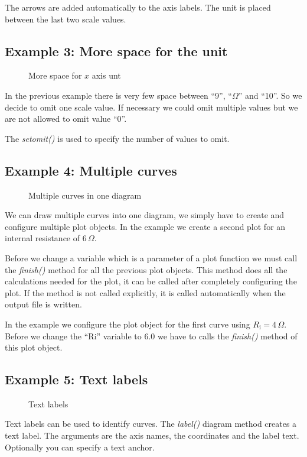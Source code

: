 \documentclass[origlongtable]{scrartcl}
\newcommand{\includepgfimage}[2]{%
\begin{figure}%
{\centering%
\caption{#2}\label{fig:#1}%
}%
\end{figure}%
}
\begin{document}
The arrows are added automatically to the axis labels.
The unit is placed between the last two scale values.
\clearpage
\subsection[Space for unit]{Example 3: More space for the unit}
\includepgfimage{../examples/test003a}{More space for \(x\) axis unt}
In the previous example there is very few space between ``9'', ``\(\Omega\)''
and ``10''. So we decide to omit one scale value. If necessary we could
omit multiple values but we are not allowed to omit value ``0''.

The \textit{set\textunderscore{}omit()\/} is used to specify the number
of values to omit.

\clearpage
\subsection[Multiple curves]{Example 4: Multiple curves}
\includepgfimage{../examples/test004a}{Multiple curves in one diagram}
We can draw multiple curves into one diagram, we simply have to
create and configure multiple plot objects.
In the example we create a second plot for an internal resistance
of \(6\,\Omega\).

Before we change a variable which is a parameter of a plot function
we must call the \textit{finish()\/} method for all the previous
plot objects. This method does all the calculations needed for the
plot, it can be called after completely configuring the plot.
If the method is not called explicitly, it is called automatically
when the output file is written.

In the example we configure the plot object for the first curve
using \(R_{\text{i}}=4\,\Omega\). Before we change the
``\textdollar{}Ri'' variable to 6.0 we have to calls the
\textit{finish()\/} method of this plot object.

\clearpage
\subsection[Text labels]{Example 5: Text labels}
\includepgfimage{../examples/test005a}{Text labels}
Text labels can be used to identify curves. The
\textit{label()\/} diagram method creates a text label.
The arguments are the axis names, the coordinates and the label text.
Optionally you can specify a text anchor.
\end{document}
